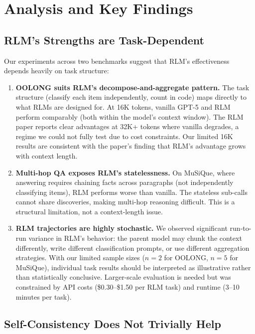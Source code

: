 \documentclass[11pt]{article}
\begin{document}
\section{Analysis and Key Findings}

\subsection{RLM's Strengths are Task-Dependent}

Our experiments across two benchmarks suggest that RLM's effectiveness depends heavily on task structure:

\begin{enumerate}
    \item \textbf{OOLONG suits RLM's decompose-and-aggregate pattern.} The task structure (classify each item independently, count in code) maps directly to what RLMs are designed for. At 16K tokens, vanilla GPT-5 and RLM perform comparably (both within the model's context window). The RLM paper reports clear advantages at 32K+ tokens where vanilla degrades, a regime we could not fully test due to cost constraints. Our limited 16K results are consistent with the paper's finding that RLM's advantage grows with context length.

    \item \textbf{Multi-hop QA exposes RLM's statelessness.} On MuSiQue, where answering requires chaining facts across paragraphs (not independently classifying items), RLM performs worse than vanilla. The stateless sub-calls cannot share discoveries, making multi-hop reasoning difficult. This is a structural limitation, not a context-length issue.

    \item \textbf{RLM trajectories are highly stochastic.} We observed significant run-to-run variance in RLM's behavior: the parent model may chunk the context differently, write different classification prompts, or use different aggregation strategies. With our limited sample sizes ($n=2$ for OOLONG, $n=5$ for MuSiQue), individual task results should be interpreted as illustrative rather than statistically conclusive. Larger-scale evaluation is needed but was constrained by API costs (\$0.30--\$1.50 per RLM task) and runtime (3--10 minutes per task).
\end{enumerate}

\subsection{Self-Consistency Does Not Trivially Help}
\end{document}
